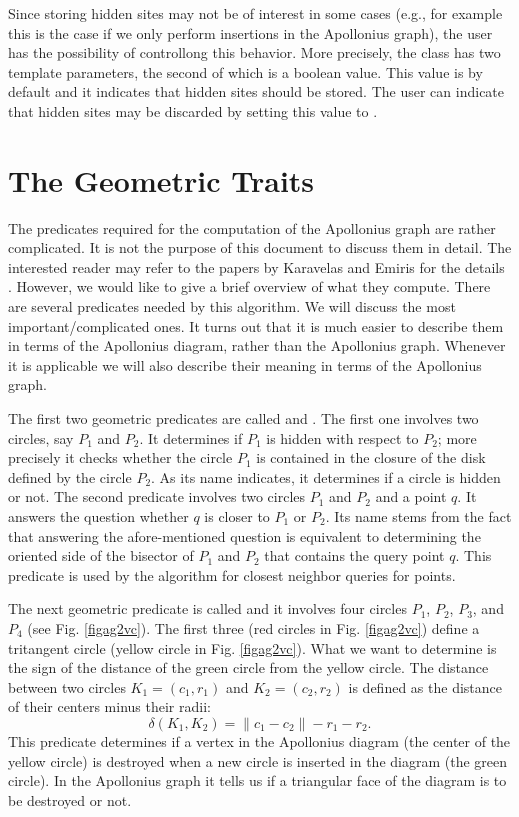 Since storing hidden sites may not be of interest in some cases (e.g.,
for example this is the case if we only perform insertions in the
Apollonius graph), the user has the possibility of controllong this
behavior. More precisely, the class
 has two template
parameters, the second of which is a boolean value. This value is by
default  and it indicates that hidden sites should be
stored. The user can indicate that hidden sites may be discarded
by setting this value to .


\section{The Geometric Traits}
\label{sec:apollonius2-traits}

The predicates required for the computation of the Apollonius graph
are rather complicated. It is not the purpose of this document to
discuss them in detail. The interested reader may refer to the papers
by Karavelas and Emiris for the details
\cite{cgal:ke-ppawv-02,cgal:ke-rctac-03}. However, we would like to give a brief
overview of what they 
compute. There are several predicates needed by this algorithm. We
will discuss the most important/complicated ones. It turns out that
it is much easier to describe them in terms of the Apollonius diagram,
rather than the Apollonius graph. Whenever it is applicable we will also
describe their meaning in terms of the Apollonius graph.


The first two geometric predicates are called
 and . The first one
involves two circles, say $P_1$ and $P_2$. It determines if $P_1$ is
hidden with respect to $P_2$; more precisely it checks whether the
circle $P_1$ is contained in the closure of the disk defined by the
circle $P_2$. As its name indicates, it determines if a circle is
hidden or not. The second predicate involves two circles $P_1$ and
$P_2$ and a point $q$. It answers the question whether $q$ is closer
to $P_1$ or $P_2$. Its name stems from the fact that answering the
afore-mentioned question is equivalent to determining the oriented
side of the bisector of $P_1$ and $P_2$ that contains the query point
$q$. This predicate is used by the algorithm for closest neighbor
queries for points.


The next geometric predicate is called  and it
involves four circles $P_1$, $P_2$, $P_3$, and $P_4$ (see
Fig. \ref{figag2vc}). The first three (red circles in
Fig. \ref{figag2vc}) define a tritangent circle (yellow
circle in Fig. \ref{figag2vc}). What we want to determine is
the sign of the distance of the green circle from the yellow
circle. The distance between two circles $K_1=(c_1,r_1)$ and
$K_2=(c_2, r_2)$ is defined as the distance of their centers minus
their radii:
\[   \delta(K_1, K_2) = \|c_1-c_2\|-r_1-r_2. \]
This predicate determines if a vertex in the Apollonius diagram
(the center of the yellow circle) is destroyed when a new circle is
inserted in the diagram (the green circle). In the Apollonius graph
it tells us if a triangular face of the diagram is to be destroyed or
not.

